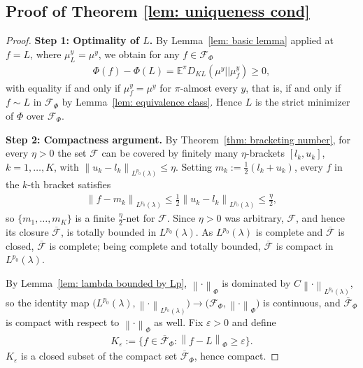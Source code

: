 \documentclass{amsart}
\theoremstyle{definition}
\newcommand{\E}{{\mathbb E}}
\newcommand{\norm}[1]{\left\|#1\right\|}
\newcommand{\F}{\mathcal{F}}
\newcommand{\KL}[2]{D_{KL}\left(#1 || #2\right)}
\begin{document}
\subsection*{Proof of Theorem \ref{lem: uniqueness cond}}
\begin{proof}
    \textbf{Step 1: Optimality of $L$.}
    By Lemma~\ref{lem: basic lemma} applied at $f = L$, where $\mu_L^y = \mu^y$, we obtain for any $f \in \F_\Phi$
    \begin{eqnarray*}
        \Phi(f) - \Phi(L) = \E^\pi \KL{\mu^y}{\mu^y_f} \ge 0,
    \end{eqnarray*}
    with equality if and only if $\mu^y_f = \mu^y$ for $\pi$-almost every $y$, that is, if and only if $f \sim L$ in $\F_\Phi$ by Lemma~\ref{lem: equivalence class}. Hence $L$ is the strict minimizer of $\Phi$ over $\F_\Phi$.

    \textbf{Step 2: Compactness argument.}
    By Theorem~\ref{thm: bracketing number}, for every $\eta > 0$ the set $\F$ can be covered by finitely many $\eta$-brackets $[l_k, u_k]$, $k = 1, \ldots, K$, with $\norm{u_k - l_k}_{L^{p_0}(\lambda)} \le \eta$. Setting $m_k := \tfrac{1}{2}(l_k + u_k)$, every $f$ in the $k$-th bracket satisfies
    \begin{eqnarray*}
        \norm{f - m_k}_{L^{p_0}(\lambda)} \le \tfrac{1}{2}\norm{u_k - l_k}_{L^{p_0}(\lambda)} \le \tfrac{\eta}{2},
    \end{eqnarray*}
    so $\{m_1, \ldots, m_K\}$ is a finite $\tfrac{\eta}{2}$-net for $\F$. Since $\eta > 0$ was arbitrary, $\F$, and hence its closure $\overline{\F}$, is totally bounded in $L^{p_0}(\lambda)$. As $L^{p_0}(\lambda)$ is complete and $\overline{\F}$ is closed, $\overline{\F}$ is complete; being complete and totally bounded, $\overline{\F}$ is compact in $L^{p_0}(\lambda)$.

    By Lemma~\ref{lem: lambda bounded by Lp}, $\norm{\cdot}_\Phi$ is dominated by $C\norm{\cdot}_{L^{p_0}(\lambda)}$, so the identity map $\big(L^{p_0}(\lambda), \norm{\cdot}_{L^{p_0}(\lambda)}\big) \to \big(\F_\Phi, \norm{\cdot}_\Phi\big)$ is continuous, and $\overline{\F}_\Phi$ is compact with respect to $\norm{\cdot}_\Phi$ as well.
    Fix $\varepsilon > 0$ and define
    \begin{eqnarray*}
        K_\varepsilon := \{ f \in \overline{\F}_\Phi : \norm{f - L}_\Phi \ge \varepsilon \}.
    \end{eqnarray*}
    $K_\varepsilon$ is a closed subset of the compact set $\overline{\F}_\Phi$, hence compact.


\end{proof}
\end{document}
